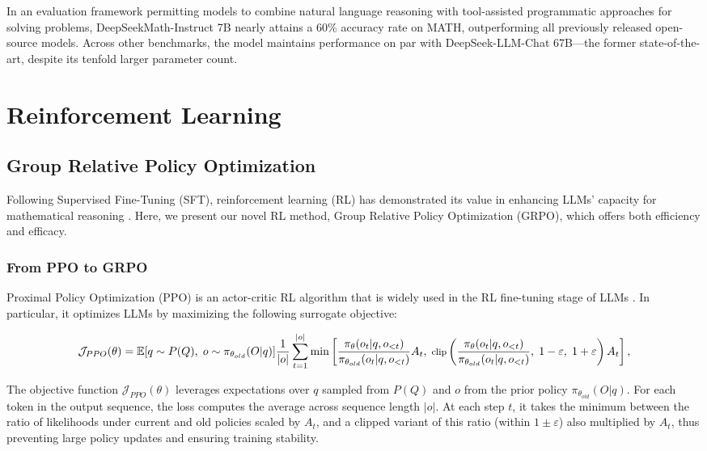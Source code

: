 In an evaluation framework permitting models to combine natural language reasoning with tool-assisted programmatic approaches for solving problems, DeepSeekMath-Instruct 7B nearly attains a 60\% accuracy rate on MATH, outperforming all previously released open-source models. Across other benchmarks, the model maintains performance on par with DeepSeek-LLM-Chat 67B—the former state-of-the-art, despite its tenfold larger parameter count.  
\section{Reinforcement Learning}

\subsection{Group Relative Policy Optimization} Following Supervised Fine-Tuning (SFT), reinforcement learning (RL) has demonstrated its value in enhancing LLMs' capacity for mathematical reasoning \citep{wang2023math,wizardmath}. Here, we present our novel RL method, Group Relative Policy Optimization (GRPO), which offers both efficiency and efficacy.

\subsubsection{From PPO to GRPO} Proximal Policy Optimization (PPO) \citep{schulman2017proximal} is an actor-critic RL algorithm that is widely used in the RL fine-tuning stage of LLMs \citep{ouyang2022training}. In particular, it optimizes LLMs by maximizing the following surrogate objective:

\begin{equation}
\footnotesize
    \mathcal{J}_{PPO}(\theta) = \mathbb{E}{[q \sim P(Q),\ o \sim \pi_{\theta_{old}}(O|q)]} \frac{1}{|o|} \sum_{t=1}^{|o|} \min \left[ \frac{\pi_\theta(o_{t} | q, o_{<t})}{\pi_{\theta_{old}}(o_{t} | q, o_{<t})} A_{t},\ \text{clip}\left(\frac{\pi_\theta(o_{t} | q, o_{<t})}{\pi_{\theta_{old}}(o_{t} | q, o_{<t})},\ 1 - \varepsilon,\ 1 + \varepsilon \right) A_{t} \right],
\end{equation}

The objective function $\mathcal{J}_{PPO}(\theta)$ leverages expectations over $q$ sampled from $P(Q)$ and $o$ from the prior policy $\pi_{\theta_{old}}(O|q)$. For each token in the output sequence, the loss computes the average across sequence length $|o|$. At each step $t$, it takes the minimum between the ratio of likelihoods under current and old policies scaled by $A_t$, and a clipped variant of this ratio (within $1 \pm \varepsilon$) also multiplied by $A_t$, thus preventing large policy updates and ensuring training stability.

